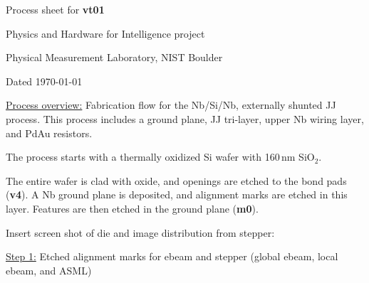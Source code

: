 \documentclass{scrartcl}
\begin{document}
\centerline{\LARGE Process sheet for \textbf{vt01}}
\vspace{0.5em}
\centerline{\Large Physics and Hardware for Intelligence project}
\vspace{0.5em}
\centerline{\large Physical Measurement Laboratory, NIST Boulder}
\vspace{0.5em}
\centerline{Dated \today}

\begin{figure}[!h]
\centering
\setlength{\fboxsep}{0pt}%
\setlength{\fboxrule}{0pt}%
\end{figure}

\noindent \underline{Process overview:} Fabrication flow for the Nb/Si/Nb, externally shunted JJ process. This process includes a ground plane, JJ tri-layer, upper Nb wiring layer, and PdAu resistors.

The process starts with a thermally oxidized Si wafer with 160\,nm SiO$_2$. 

The entire wafer is clad with oxide, and openings are etched to the bond pads (\textbf{v4}). A Nb ground plane is deposited, and alignment marks are etched in this layer. Features are then etched in the ground plane (\textbf{m0}).

\vspace{2em}\noindent Insert screen shot of die and image distribution from stepper:


\newpage
\noindent \underline{Step 1:} Etched alignment marks for ebeam and stepper (global ebeam, local ebeam, and ASML)
\end{document}
